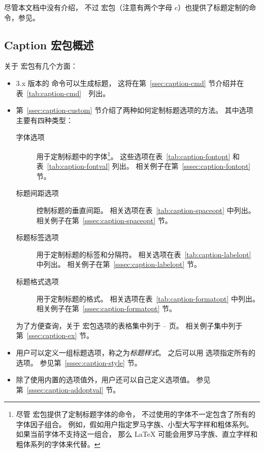尽管本文档中没有介绍，
不过  宏包（注意有两个字母 c）也提供了标题定制的命令，参见\cite{ccaption-doc}。

\subsection{Caption 宏包概述}\label{ssec:caption-overview}

关于  宏包有几个方面：
\begin{itemize}
	\item 3.x 版本的  命令可以生成标题，
	这将在第~\ref{ssec:caption-cmd} 节介绍并在表~\ref{tab:caption-cmd}　列出。
	
	\item 第~\ref{ssec:caption-custom} 节介绍了两种如何定制标题选项的方法。
	其中选项主要有四种类型：
	\begin{description}
		\item[字体选项] 用于定制标题中的字体\footnote{
			尽管  宏包提供了定制标题字体的命令，
			不过使用的字体不一定包含了所有的字体因子组合。
			例如，假如用户指定罗马字族、小型大写字样和粗体系列。
			如果当前字体不支持这一组合，
			那么 \LaTeX{} 可能会用罗马字族、直立字样和粗体系列的字体来代替。}。
		这些选项在表~\ref{tab:caption-fontopt} 和表~\ref{tab:caption-fontval} 列出。
		相关例子在第~\ref{sssec:caption-fontopt} 节。
		
		\item[标题间距选项] 控制标题的垂直间距。
		相关选项在表~\ref{tab:caption-spaceopt} 中列出。
		相关例子在第~\ref{sssec:caption-spaceopt} 节。
		
		\item[标题标签选项] 用于定制标题的标签和分隔符。
		相关选项在表~\ref{tab:caption-labelopt} 中列出。
		相关例子在第~\ref{sssec:caption-labelopt} 节。
		
		\item[标题格式选项] 用于定制标题的格式。
		相关选项在表~\ref{tab:caption-formatopt} 中列出。
		相关例子在第~\ref{sssec:caption-formatopt} 节。
	\end{description}
	为了方便查询，关于  宏包选项的表格集中列于 \pageref{tab:caption-fontopt}--\pageref{tab:caption-formatopt} 页。
	相关例子集中列于第~\ref{ssec:caption-ex} 节。
	
	\item 用户可以定义一组标题选项，称之为\emph{标题样式}。
	之后可以用  选项指定所有的选项。
	参见第~\ref{sssec:caption-style} 节。
	
	\item 除了使用内置的选项值外，用户还可以自己定义选项值。
	参见第~\ref{sssec:caption-addoptval} 节。
\end{itemize}

